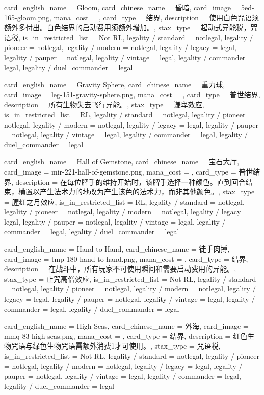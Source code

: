 \documentclass[lang = cn, color = black, 10pt]{AllThatStax}
\begin{document}
\card
{
	card_english_name = {Gloom},
	card_chinese_name = {昏暗},
	card_image = 5ed-165-gloom.png,
	mana_cost = ,
	card_type = 结界,
	description = {使用白色咒语须额外多付出。白色结界的启动费用须额外增加。},
	stax_type = 起动式异能税，咒语税,
	is_in_restricted_list = Not RL,
	legality / standard = notlegal,
	legality / pioneer = notlegal,
	legality / modern = notlegal,
	legality / legacy = legal,
	legality / pauper = notlegal,
	legality / vintage = legal,
	legality / commander = legal,
	legality / duel_commander = legal
}

\card
{
	card_english_name = {Gravity Sphere},
	card_chinese_name = {重力球},
	card_image = leg-151-gravity-sphere.png,
	mana_cost = ,
	card_type = 普世结界,
	description = {所有生物失去飞行异能。},
	stax_type = 谦卑效应,
	is_in_restricted_list = RL,
	legality / standard = notlegal,
	legality / pioneer = notlegal,
	legality / modern = notlegal,
	legality / legacy = legal,
	legality / pauper = notlegal,
	legality / vintage = legal,
	legality / commander = legal,
	legality / duel_commander = legal
}

\card
{
	card_english_name = {Hall of Gemstone},
	card_chinese_name = {宝石大厅},
	card_image = mir-221-hall-of-gemstone.png,
	mana_cost = ,
	card_type = 普世结界,
	description = {在每位牌手的维持开始时，该牌手选择一种颜色。直到回合结束，横置以产生法术力的地改为产生该色的法术力，而非其他颜色。},
	stax_type = 腥红之月效应,
	is_in_restricted_list = RL,
	legality / standard = notlegal,
	legality / pioneer = notlegal,
	legality / modern = notlegal,
	legality / legacy = legal,
	legality / pauper = notlegal,
	legality / vintage = legal,
	legality / commander = legal,
	legality / duel_commander = legal
}

\card
{
	card_english_name = {Hand to Hand},
	card_chinese_name = {徒手肉搏},
	card_image = tmp-180-hand-to-hand.png,
	mana_cost = ,
	card_type = 结界,
	description = {在战斗中，所有玩家不可使用瞬间和需要启动费用的异能。},
	stax_type = 止咒高僧效应,
	is_in_restricted_list = Not RL,
	legality / standard = notlegal,
	legality / pioneer = notlegal,
	legality / modern = notlegal,
	legality / legacy = legal,
	legality / pauper = notlegal,
	legality / vintage = legal,
	legality / commander = legal,
	legality / duel_commander = legal
}

\card
{
	card_english_name = {High Seas},
	card_chinese_name = {外海},
	card_image = mmq-83-high-seas.png,
	mana_cost = ,
	card_type = 结界,
	description = {红色生物咒语与绿色生物咒语需额外消费1才可使用。},
	stax_type = 咒语税,
	is_in_restricted_list = Not RL,
	legality / standard = notlegal,
	legality / pioneer = notlegal,
	legality / modern = notlegal,
	legality / legacy = legal,
	legality / pauper = notlegal,
	legality / vintage = legal,
	legality / commander = legal,
	legality / duel_commander = legal
}
\end{document}

